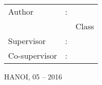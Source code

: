 \begin{titlepage}
\begin{center}
		\vspace{40pt}

		\raggedleft
		\begin{minipage}{0.6\linewidth}
			\fontsize{14}{16pt}\selectfont
			\begin{tabular}{ l c l }
			Author & : & \textbf{\thesisAuthor}\\
					& & Class \studentClass\\
			Supervisor & : & \textbf{\supervisor} \\
			Co-supervisor & : & \textbf{\cosupervisor}
			\end{tabular}
		\end{minipage}
		\vfill
		\centering
		\fontsize{16}{16pt}\selectfont
		\MakeUppercase{Hanoi, 05 -- 2016}
	\end{center}
	\cleardoublepage
\end{titlepage}